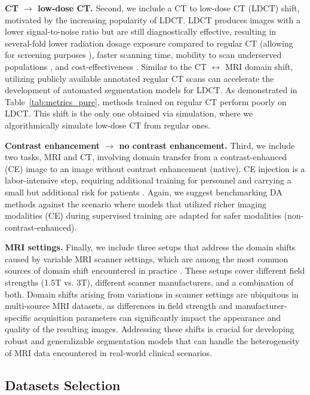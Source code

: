 \textbf{CT $\rightarrow$ low-dose CT.} Second, we include a CT to low-dose CT (LDCT) shift, motivated by the increasing popularity of LDCT. LDCT produces images with a lower signal-to-noise ratio but are still diagnostically effective, resulting in several-fold lower radiation dosage exposure compared to regular CT (allowing for screening purposes \cite{lidc,kubo2016standard}), faster scanning time, mobility to scan underserved populations \cite{raghavan2020initial}, and cost-effectiveness \cite{mohammadshahi2019cost}. Similar to the CT $\leftrightarrow$ MRI domain shift, utilizing publicly available annotated regular CT scans can accelerate the development of automated segmentation models for LDCT. As demonstrated in Table~\ref{tab:metrics_pure}, methods trained on regular CT perform poorly on LDCT. This shift is the only one obtained via simulation, where we algorithmically simulate low-dose CT from regular ones.


\textbf{Contrast enhancement $\rightarrow$ no contrast enhancement.} Third, we include two tasks, MRI and CT, involving domain transfer from a contrast-enhanced (CE) image to an image without contrast enhancement (native). CE injection is a labor-intensive step, requiring additional training for personnel and carrying a small but additional risk for patients \cite{andreucci2014side,costelloe2020risks}. Again, we suggest benchmarking DA methods against the scenario where models that utilized richer imaging modalities (CE) during supervised training are adapted for safer modalities (non-contrast-enhanced).


\textbf{MRI settings.} Finally, we include three setups that address the domain shifts caused by variable MRI scanner settings, which are among the most common sources of domain shift encountered in practice \cite{yan2020mri,medim_da_survey_2023}. These setups cover different field strengths (1.5T vs. 3T), different scanner manufacturers, and a combination of both. Domain shifts arising from variations in scanner settings are ubiquitous in multi-source MRI datasets, as differences in field strength and manufacturer-specific acquisition parameters can significantly impact the appearance and quality of the resulting images. Addressing these shifts is crucial for developing robust and generalizable segmentation models that can handle the heterogeneity of MRI data encountered in real-world clinical scenarios.



\subsection{Datasets Selection}

